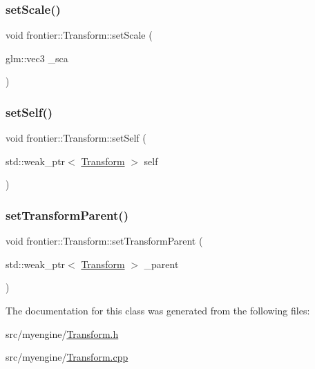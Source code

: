 \mbox{\label{classfrontier_1_1_transform_ae398759cf3fb01eeb6989aa52a602d55}} 
\subsubsection{\texorpdfstring{set\+Scale()}{setScale()}}
{\footnotesize\ttfamily void frontier\+::\+Transform\+::set\+Scale (\begin{DoxyParamCaption}\item[{glm\+::vec3}]{\+\_\+sca }\end{DoxyParamCaption})}

\mbox{\label{classfrontier_1_1_transform_aab8d4bc98d9de708ba1ab9cd8e0d7f64}} 
\subsubsection{\texorpdfstring{set\+Self()}{setSelf()}}
{\footnotesize\ttfamily void frontier\+::\+Transform\+::set\+Self (\begin{DoxyParamCaption}\item[{std\+::weak\+\_\+ptr$<$ \hyperlink{classfrontier_1_1_transform}{Transform} $>$}]{self }\end{DoxyParamCaption})}

\mbox{\label{classfrontier_1_1_transform_ad4e673db3400d3c505ceb9fc1ececfbb}} 
\subsubsection{\texorpdfstring{set\+Transform\+Parent()}{setTransformParent()}}
{\footnotesize\ttfamily void frontier\+::\+Transform\+::set\+Transform\+Parent (\begin{DoxyParamCaption}\item[{std\+::weak\+\_\+ptr$<$ \hyperlink{classfrontier_1_1_transform}{Transform} $>$}]{\+\_\+parent }\end{DoxyParamCaption})}



The documentation for this class was generated from the following files\+:\begin{DoxyCompactItemize}
\item 
src/myengine/\hyperlink{_transform_8h}{Transform.\+h}\item 
src/myengine/\hyperlink{_transform_8cpp}{Transform.\+cpp}\end{DoxyCompactItemize}
